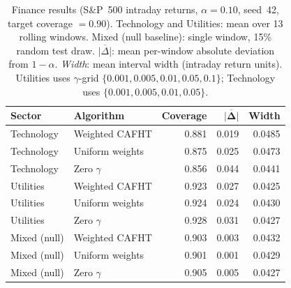 \begin{table}[ht]
\centering
\small
\setlength{\tabcolsep}{8pt}
\renewcommand{\arraystretch}{1.15}
\caption{%
  Finance results (S\&P~500 intraday returns, $\alpha=0.10$, seed~42, target coverage $= 0.90$). Technology and Utilities: mean over 13 rolling windows. Mixed (null baseline): single window, 15\% random test draw. $\overline{|\Delta|}$: mean per-window absolute deviation from $1-\alpha$. \textit{Width}: mean interval width (intraday return units). Utilities uses $\gamma$-grid $\{0.001, 0.005, 0.01, 0.05, 0.1\}$; Technology uses $\{0.001, 0.005, 0.01, 0.05\}$.
}
\label{tab:finance}
\begin{tabular}{@{} llrrr @{}}
\toprule
{\bfseries Sector} & {\bfseries Algorithm}  & {\bfseries Coverage} & $\boldsymbol{\overline{|\Delta|}}$ & {\bfseries Width} \\
\midrule
Technology
  & Weighted CAFHT     & 0.881 & 0.019 & 0.0485 \\
Technology
  & Uniform weights    & 0.875 & 0.025 & 0.0473 \\
Technology
  & Zero $\gamma$      & 0.856 & 0.044 & 0.0441 \\
\midrule
Utilities
  & Weighted CAFHT     & 0.923 & 0.027 & 0.0425 \\
Utilities
  & Uniform weights    & 0.924 & 0.024 & 0.0430 \\
Utilities
  & Zero $\gamma$      & 0.928 & 0.031 & 0.0427 \\
\midrule
Mixed (null)
  & Weighted CAFHT     & 0.903 & 0.003 & 0.0432 \\
Mixed (null)
  & Uniform weights    & 0.901 & 0.001 & 0.0429 \\
Mixed (null)
  & Zero $\gamma$      & 0.905 & 0.005 & 0.0427 \\
\bottomrule
\end{tabular}
\end{table}
